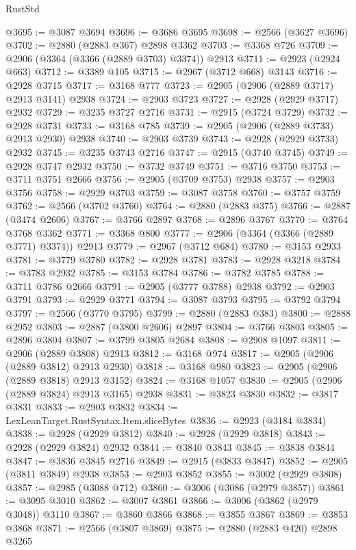 \begin{lexlean}{RustStd}
\begin{coremodule}
{\begin{coremodule}
{{{{{{{{{{{{{{{{{{{{{{{{{{{{{{{{{{{{{{{{{{{{{{{{{{{{{{{{{{{{{{{{{{{{{{{{{{{{{{@3695 := @3087 @3694
@3696 := @3686 @3695
@3698 := @2566 (@3627 @3696)
@3702 := @2880 (@2883 @367) @2898 @3362
@3703 := @3368 @726
@3709 := @2906 (@3364 (@3366 (@2889 @3703) @3374)) @2913
@3711 := @2923 (@2924 @663)
@3712 := @3389 @105
@3715 := @2967 (@3712 @668) @3143
@3716 := @2928 @3715
@3717 := @3168 @777
@3723 := @2905 (@2906 (@2889 @3717) @2913 @3141) @2938
@3724 := @2903 @3723
@3727 := @2928 (@2929 @3717) @2932
@3729 := @3235 @3727 @2716
@3731 := @2915 (@3724 @3729)
@3732 := @2928 @3731
@3733 := @3168 @785
@3739 := @2905 (@2906 (@2889 @3733) @2913 @2930) @2938
@3740 := @2903 @3739
@3743 := @2928 (@2929 @3733) @2932
@3745 := @3235 @3743 @2716
@3747 := @2915 (@3740 @3745)
@3749 := @2928 @3747 @2932
@3750 := @3732 @3749
@3751 := @3716 @3750
@3753 := @3711 @3751 @2666
@3756 := @2905 (@3709 @3753) @2938
@3757 := @2903 @3756
@3758 := @2929 @3703
@3759 := @3087 @3758
@3760 := @3757 @3759
@3762 := @2566 (@3702 @3760)
@3764 := @2880 (@2883 @375)
@3766 := @2887 (@3474 @2606)
@3767 := @3766 @2897
@3768 := @2896 @3767
@3770 := @3764 @3768 @3362
@3771 := @3368 @800
@3777 := @2906 (@3364 (@3366 (@2889 @3771) @3374)) @2913
@3779 := @2967 (@3712 @684)
@3780 := @3153 @2933
@3781 := @3779 @3780
@3782 := @2928 @3781
@3783 := @2928 @3218
@3784 := @3783 @2932
@3785 := @3153 @3784
@3786 := @3782 @3785
@3788 := @3711 @3786 @2666
@3791 := @2905 (@3777 @3788) @2938
@3792 := @2903 @3791
@3793 := @2929 @3771
@3794 := @3087 @3793
@3795 := @3792 @3794
@3797 := @2566 (@3770 @3795)
@3799 := @2880 (@2883 @383)
@3800 := @2888 @2952
@3803 := @2887 (@3800 @2606) @2897
@3804 := @3766 @3803
@3805 := @2896 @3804
@3807 := @3799 @3805 @2684
@3808 := @2908 @1097
@3811 := @2906 (@2889 @3808) @2913
@3812 := @3168 @974
@3817 := @2905 (@2906 (@2889 @3812) @2913 @2930)
@3818 := @3168 @980
@3823 := @2905 (@2906 (@2889 @3818) @2913 @3152)
@3824 := @3168 @1057
@3830 := @2905 (@2906 (@2889 @3824) @2913 @3165) @2938
@3831 := @3823 @3830
@3832 := @3817 @3831
@3833 := @2903 @3832
@3834 := LexLeanTarget.RustSyntax.Item.sliceBytes
@3836 := @2923 (@3184 @3834)
@3838 := @2928 (@2929 @3812)
@3840 := @2928 (@2929 @3818)
@3843 := @2928 (@2929 @3824) @2932
@3844 := @3840 @3843
@3845 := @3838 @3844
@3847 := @3836 @3845 @2716
@3849 := @2915 (@3833 @3847)
@3852 := @2905 (@3811 @3849) @2938
@3853 := @2903 @3852
@3855 := @3002 (@2929 @3808)
@3857 := @2985 (@3088 @712)
@3860 := @3006 (@3086 (@2979 @3857))
@3861 := @3095 @3010
@3862 := @3007 @3861
@3866 := @3006 (@3862 (@2979 @3048)) @3110
@3867 := @3860 @3866
@3868 := @3855 @3867
@3869 := @3853 @3868
@3871 := @2566 (@3807 @3869)
@3875 := @2880 (@2883 @420) @2898 @3265
}}}}}}}}}}}}}}}}}}}}}}}}}}}}}}}}}}}}}}}}}}}}}}}}}}}}}}}}}}}}}}}}}}}}}}}}}}}}}}
\end{coremodule}}
\end{coremodule}
\end{lexlean}
